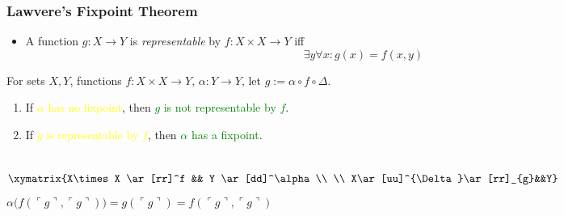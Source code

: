 \documentclass[UTF8,aspectratio=43,11pt,colorlinks,compress,openany]{beamer}%
\begin{document}
\begin{frame}\frametitle{Lawvere's Fixpoint Theorem}
	\begin{itemize}
		\item A function $g: X\to Y$ is \emph{representable} by $f: X\times X\to Y$ iff
		\[\exists y\forall x: g(x)=f(x,y)\]
	\end{itemize}
	\begin{theorem}
		For sets $X, Y$, functions $f: X\times X\to Y$, $\alpha: Y\to Y$, let $g:=\alpha\circ f\circ\Delta$.
		\begin{enumerate}
			\item If \textcolor{yellow}{$\alpha$ has no fixpoint}, then \textcolor{green}{$g$ is not representable by $f$}.
			\item If \textcolor{yellow}{$g$ is representable by $f$}, then \textcolor{green}{$\alpha$ has a fixpoint}.
		\end{enumerate}
	\end{theorem}
	\begin{columns}[onlytextwidth]
			\[\xymatrix{X\times X
				\ar[rr]^f && Y \ar[dd]^\alpha
				\\
				\\
				X\ar[uu]^{\Delta}\ar[rr]_{g}&&Y}\]
				$\alpha\big(f\left(\ulcorner g\urcorner,\ulcorner g\urcorner\right)\big)=g\left(\ulcorner g\urcorner\right)=f\left(\ulcorner g\urcorner,\ulcorner g\urcorner\right)$
	\end{columns}
\end{frame}
\end{document}
